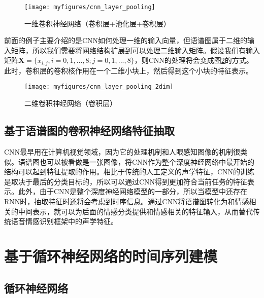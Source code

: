 \begin{figure}[htb] %
    \vspace{-0.5cm}  %
    \setlength{\belowcaptionskip}{0cm}   %
    \centering
    \texttt{[image: myfigures/cnn\_layer\_pooling]}
    \caption{一维卷积神经网络（卷积层+池化层+卷积层）}
    \label{fig:cnn_layer_pooling}
\end{figure}

前面的例子主要介绍的是CNN如何处理一维的输入向量，但语谱图属于二维的输入矩阵，所以我们需要将网络结构扩展到可以处理二维输入矩阵。假设我们有输入矩阵$\mathbf{X}=\{x_{i,j}, i=0,1,...,8; j=0,1,...,8\}$，则CNN的处理将会变成图\ref{fig:cnn_layer_pooling_2dim}的方式。此时，卷积层的卷积核作用在一个二维小块上，然后得到这个小块的特征表示。

\begin{figure}[htb] %
    \vspace{-0.5cm}  %
    \setlength{\belowcaptionskip}{0cm}   %
    \centering
    \texttt{[image: myfigures/cnn\_layer\_pooling\_2dim]}
    \caption{二维卷积神经网络（卷积层）}
    \label{fig:cnn_layer_pooling_2dim}
\end{figure}

\subsection{基于语谱图的卷积神经网络特征抽取}
\label{ssec:cnn_spectrogram_feature_extract}

CNN最早用在计算机视觉领域，因为它的处理机制和人眼感知图像的机制很类似。语谱图也可以被看做是一张图像，将CNN作为整个深度神经网络中最开始的结构可以起到特征提取的作用。相比于传统的人工定义的声学特征，CNN的训练是取决于最后的分类目标的，所以可以通过CNN得到更加符合当前任务的特征表示。此外，由于CNN是整个深度神经网络模型的一部分，所以当模型中还存在RNN时，抽取特征时还将会考虑到时序信息。通过CNN将语谱图转化为和情感相关的中间表示，就可以为后面的情感分类提供和情感相关的特征输入，从而替代传统语音情感识别框架中的声学特征。

\section{基于循环神经网络的时间序列建模}
\label{sec:rnn_seq_model}

\subsection{循环神经网络}
\label{ssec:rnn}

